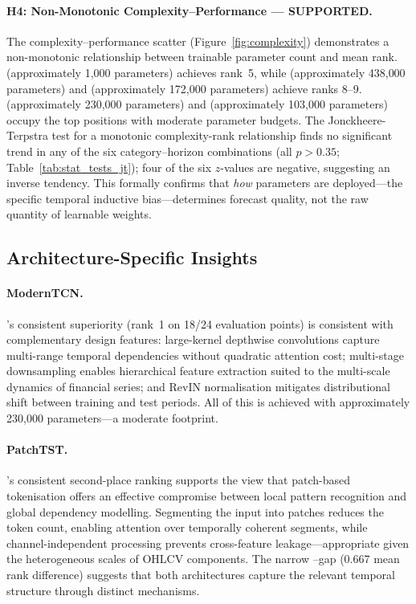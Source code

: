 \paragraph{H4: Non-Monotonic Complexity--Performance --- SUPPORTED.}
The complexity--performance scatter (Figure~\ref{fig:complexity}) demonstrates a non-monotonic relationship between trainable parameter count and mean \rmse rank.  \dlinear (approximately 1{,}000 parameters) achieves rank~5, while \autoformer (approximately 438{,}000 parameters) and \lstm (approximately 172{,}000 parameters) achieve ranks 8--9.  \moderntcn (approximately 230{,}000 parameters) and \patchtst (approximately 103{,}000 parameters) occupy the top positions with moderate parameter budgets.  The Jonckheere-Terpstra test for a monotonic complexity-rank relationship finds no significant trend in any of the six category--horizon combinations (all $p > 0.35$; Table~\ref{tab:stat_tests_jt}); four of the six $z$-values are negative, suggesting an inverse tendency.  This formally confirms that \emph{how} parameters are deployed---the specific temporal inductive bias---determines forecast quality, not the raw quantity of learnable weights.

\subsection{Architecture-Specific Insights}
\label{sec:architecture_insights}

\paragraph{ModernTCN.}
\moderntcn's consistent superiority (rank~1 on 18/24 evaluation points) is consistent with complementary design features: large-kernel depthwise convolutions capture multi-range temporal dependencies without quadratic attention cost; multi-stage downsampling enables hierarchical feature extraction suited to the multi-scale dynamics of financial series; and RevIN normalisation mitigates distributional shift between training and test periods.  All of this is achieved with approximately 230{,}000 parameters---a moderate footprint.

\paragraph{PatchTST.}
\patchtst's consistent second-place ranking supports the view that patch-based tokenisation offers an effective compromise between local pattern recognition and global dependency modelling.  Segmenting the input into patches reduces the token count, enabling attention over temporally coherent segments, while channel-independent processing prevents cross-feature leakage---appropriate given the heterogeneous scales of OHLCV components.  The narrow \moderntcn--\patchtst gap (0.667 mean rank difference) suggests that both architectures capture the relevant temporal structure through distinct mechanisms.

